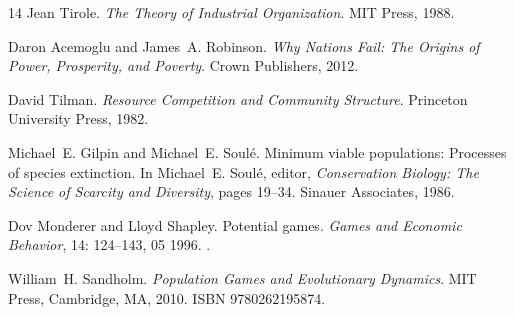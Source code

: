 \documentclass[11pt]{article}
\theoremstyle{plain}
\theoremstyle{definition}
\theoremstyle{remark}
\begin{document}
\begin{thebibliography}{14}
Jean Tirole.
\newblock \emph{The Theory of Industrial Organization}.
\newblock MIT Press, 1988.

Daron Acemoglu and James~A. Robinson.
\newblock \emph{Why Nations Fail: The Origins of Power, Prosperity, and
  Poverty}.
\newblock Crown Publishers, 2012.

David Tilman.
\newblock \emph{Resource Competition and Community Structure}.
\newblock Princeton University Press, 1982.

Michael~E. Gilpin and Michael~E. Soul{\'e}.
\newblock Minimum viable populations: Processes of species extinction.
\newblock In Michael~E. Soul{\'e}, editor, \emph{Conservation Biology: The
  Science of Scarcity and Diversity}, pages 19--34. Sinauer Associates, 1986.

Dov Monderer and Lloyd Shapley.
\newblock Potential games.
\newblock \emph{Games and Economic Behavior}, 14: 124--143, 05 1996.
\newblock {}.

William~H. Sandholm.
\newblock \emph{Population Games and Evolutionary Dynamics}.
\newblock MIT Press, Cambridge, MA, 2010.
\newblock ISBN 9780262195874.

\end{thebibliography}
\end{document}
